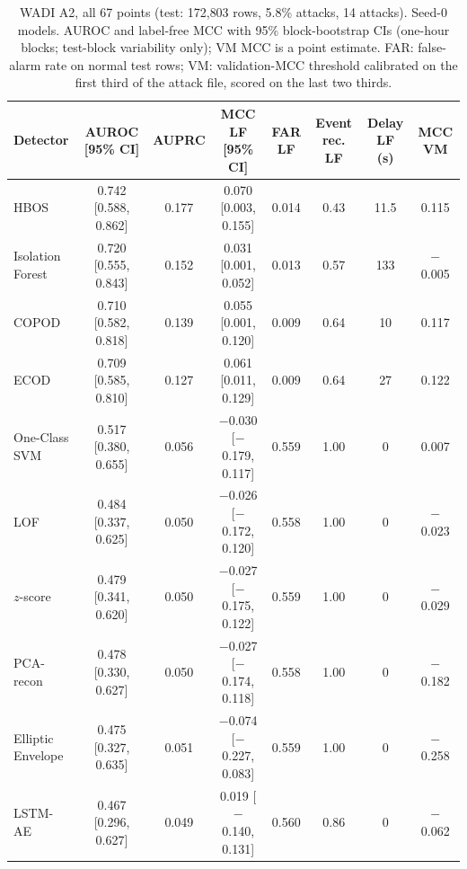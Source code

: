\documentclass[11pt]{article}
\begin{document}
\begin{table}[t]
\centering\small
\caption{WADI A2, all 67 points (test: 172{,}803 rows, 5.8\% attacks, 14 attacks). Seed-0 models. AUROC and label-free MCC with 95\% block-bootstrap CIs (one-hour blocks; test-block variability only); VM MCC is a point estimate. FAR: false-alarm rate on normal test rows; VM: validation-MCC threshold calibrated on the first third of the attack file, scored on the last two thirds.}
\label{tab:wadi}
\begin{tabular}{lccccccc}
\toprule
Detector & AUROC [95\% CI] & AUPRC & MCC LF [95\% CI] & FAR LF & Event rec. LF & Delay LF (s) & MCC VM \\
\midrule
HBOS & 0.742 [0.588, 0.862] & 0.177 & 0.070 [0.003, 0.155] & 0.014 & 0.43 & 11.5 & 0.115 \\
Isolation Forest & 0.720 [0.555, 0.843] & 0.152 & 0.031 [0.001, 0.052] & 0.013 & 0.57 & 133 & $-$0.005 \\
COPOD & 0.710 [0.582, 0.818] & 0.139 & 0.055 [0.001, 0.120] & 0.009 & 0.64 & 10 & 0.117 \\
ECOD & 0.709 [0.585, 0.810] & 0.127 & 0.061 [0.011, 0.129] & 0.009 & 0.64 & 27 & 0.122 \\
One-Class SVM & 0.517 [0.380, 0.655] & 0.056 & $-$0.030 [$-$0.179, 0.117] & 0.559 & 1.00 & 0 & 0.007 \\
LOF & 0.484 [0.337, 0.625] & 0.050 & $-$0.026 [$-$0.172, 0.120] & 0.558 & 1.00 & 0 & $-$0.023 \\
$z$-score & 0.479 [0.341, 0.620] & 0.050 & $-$0.027 [$-$0.175, 0.122] & 0.559 & 1.00 & 0 & $-$0.029 \\
PCA-recon & 0.478 [0.330, 0.627] & 0.050 & $-$0.027 [$-$0.174, 0.118] & 0.558 & 1.00 & 0 & $-$0.182 \\
Elliptic Envelope & 0.475 [0.327, 0.635] & 0.051 & $-$0.074 [$-$0.227, 0.083] & 0.559 & 1.00 & 0 & $-$0.258 \\
LSTM-AE & 0.467 [0.296, 0.627] & 0.049 & 0.019 [$-$0.140, 0.131] & 0.560 & 0.86 & 0 & $-$0.062 \\
\bottomrule
\end{tabular}
\end{table}
\end{document}
